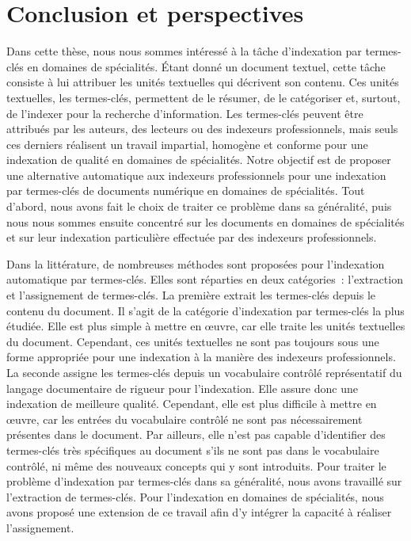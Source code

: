 \chapter{Conclusion et perspectives}
\label{chap:main-conclusion}

  Dans cette thèse, nous nous sommes intéressé à la tâche d'indexation par
  termes-clés en domaines de spécialités. Étant donné un document textuel, cette
  tâche consiste à lui attribuer les unités textuelles qui décrivent son
  contenu. Ces unités textuelles, les termes-clés, permettent de le résumer, de
  le catégoriser et, surtout, de l'indexer pour la recherche d'information. Les
  termes-clés peuvent être attribués par les auteurs, des lecteurs ou des
  indexeurs professionnels, mais seuls ces derniers réalisent un travail
  impartial, homogène et conforme pour une indexation de qualité en domaines de
  spécialités. Notre objectif est de proposer une alternative automatique aux
  indexeurs professionnels pour une indexation par termes-clés de documents
  numérique en domaines de spécialités. Tout d'abord, nous avons fait le choix
  de traiter ce problème dans sa généralité, puis nous nous sommes ensuite
  concentré sur les documents en domaines de spécialités et sur leur indexation
  particulière effectuée par des indexeurs professionnels.

  Dans la littérature, de nombreuses méthodes sont proposées pour l'indexation
  automatique par termes-clés. Elles sont réparties en deux catégories~:
  l'extraction et l'assignement de termes-clés. La première extrait les
  termes-clés depuis le contenu du document. Il s'agit de la catégorie
  d'indexation par termes-clés la plus étudiée. Elle est plus simple à mettre en
  \oe{}uvre, car elle traite les unités textuelles du document. Cependant, ces
  unités textuelles ne sont pas toujours sous une forme appropriée pour une
  indexation à la manière des indexeurs professionnels. La seconde assigne les
  termes-clés depuis un vocabulaire contrôlé représentatif du langage
  documentaire de rigueur pour l'indexation. Elle assure donc une indexation de
  meilleure qualité. Cependant, elle est plus difficile à mettre en \oe{}uvre,
  car les entrées du vocabulaire contrôlé ne sont pas nécessairement présentes
  dans le document. Par ailleurs, elle n'est pas capable d'identifier des
  termes-clés très spécifiques au document s'ils ne sont pas dans le vocabulaire
  contrôlé, ni même des nouveaux concepts qui y sont introduits. Pour traiter le
  problème d'indexation par termes-clés dans sa généralité, nous avons travaillé
  sur l'extraction de termes-clés. Pour l'indexation en domaines de spécialités,
  nous avons proposé une extension de ce travail afin d'y intégrer la capacité à
  réaliser l'assignement.

